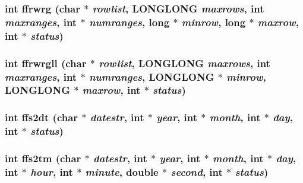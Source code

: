 \subsubsection{\setlength{\rightskip}{0pt plus 5cm}int ffrwrg (char $\ast$ {\em rowlist}, \bf{LONGLONG} {\em maxrows}, int {\em maxranges}, int $\ast$ {\em numranges}, long $\ast$ {\em minrow}, long $\ast$ {\em maxrow}, int $\ast$ {\em status})}\label{test_2roimasker_2fitsio_8h_2a49a73ce7919bc7fd5f1c3ed5bf0090}


\subsubsection{\setlength{\rightskip}{0pt plus 5cm}int ffrwrgll (char $\ast$ {\em rowlist}, \bf{LONGLONG} {\em maxrows}, int {\em maxranges}, int $\ast$ {\em numranges}, \bf{LONGLONG} $\ast$ {\em minrow}, \bf{LONGLONG} $\ast$ {\em maxrow}, int $\ast$ {\em status})}\label{test_2roimasker_2fitsio_8h_e997ee959852fc3d52dd2bbd9ba45819}


\subsubsection{\setlength{\rightskip}{0pt plus 5cm}int ffs2dt (char $\ast$ {\em datestr}, int $\ast$ {\em year}, int $\ast$ {\em month}, int $\ast$ {\em day}, int $\ast$ {\em status})}\label{test_2roimasker_2fitsio_8h_088b875388fc72d3d8ad8134a025f00c}


\subsubsection{\setlength{\rightskip}{0pt plus 5cm}int ffs2tm (char $\ast$ {\em datestr}, int $\ast$ {\em year}, int $\ast$ {\em month}, int $\ast$ {\em day}, int $\ast$ {\em hour}, int $\ast$ {\em minute}, double $\ast$ {\em second}, int $\ast$ {\em status})}\label{test_2roimasker_2fitsio_8h_1f6250df0ad32ae2dedecc8e87c5a0c4}


